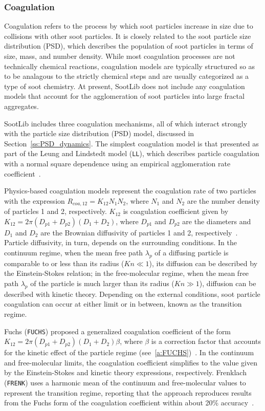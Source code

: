 \documentclass[preprint,letterpaper]{elsarticle}
\begin{document}
\subsubsection{Coagulation}
\label{sss:coa}

Coagulation refers to the process by which soot particles increase in size due to collisions with other soot particles. It is closely related to the soot particle size distribution (PSD), which describes the population of soot particles in terms of size, mass, and number density. While most coagulation processes are not technically chemical reactions, coagulation models are typically structured so as to be analagous to the strictly chemical steps and are usually categorized as a type of soot chemistry. At present, SootLib does not include any coagulation models that account for the agglomeration of soot particles into large fractal aggregates.

SootLib includes three coagulation mechanisms, all of which interact strongly with the particle size distribution (PSD) model, discussed in Section~\ref{ss:PSD_dynamics}. The simplest coagulation model is that presented as part of the Leung and Lindstedt model (\texttt{LL}), which describes particle coagulation with a normal square dependence using an empirical agglomeration rate coefficient~\cite{Leung_1991}.

Physics-based coagulation models represent the coagulation rate of two particles with the expression $R_{coa,12}=K_{12}N_1N_2$, where $N_1$ and $N_2$ are the number density of particles 1 and 2, respectively. $K_{12}$ is coagulation coefficient given by $K_{12}=2\pi (D_{p1}+D_{p2})(D_1+D_2)$, where $D_{p1}$ and $D_{p2}$ are the diameters and $D_1$ and $D_2$ are the Brownian diffusivity of particles 1 and 2, respectively~\cite{Seinfeld_2016}. Particle diffusivity, in turn, depends on the surrounding conditions. In the continuum regime, when the mean free path $\lambda_p$ of a diffusing particle is comparable to or less than its radius ($Kn\ll1$), its diffusion can be described by the Einstein-Stokes relation; in the free-molecular regime, when the mean free path $\lambda_p$ of the particle is much larger than its radius ($Kn\gg1$), diffusion can be described with kinetic theory. Depending on the external conditions, soot particle coagulation can occur at either limit or in between, known as the transition regime.

Fuchs (\texttt{FUCHS}) proposed a generalized coagulation coefficient of the form $K_{12}=2\pi (D_{p1}+D_{p2})(D_1+D_2)\beta$, where $\beta$ is a correction factor that accounts for the kinetic effect of the particle regime (see~\ref{a:FUCHS})~\cite{Fuchs_1964, Seinfeld_2016}. In the continuum and free-molecular limits, the coagulation coefficient simplifies to the value given by the Einstein-Stokes and kinetic theory expressions, respectively. Frenklach (\texttt{FRENK}) uses a harmonic mean of the continuum and free-molecular values to represent the transition regime, reporting that the approach reproduces results from the Fuchs form of the coagulation coefficient within about 20\% accuracy~\cite{Frenklach_2002b,Kazakov_1998}.
\end{document}
